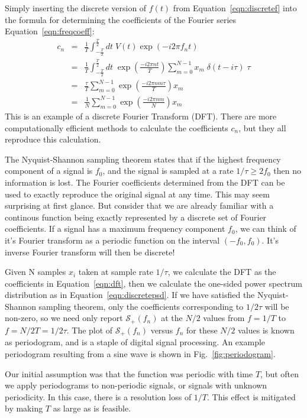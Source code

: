 \documentclass[12pt]{article}
\begin{document}
Simply inserting the discrete version of $f(t)$ from Equation~\ref{eqn:discretef} into the formula for determining the coefficients of the Fourier series Equation~\ref{eqn:freqcoeff}:
\begin{eqnarray}
c_n &=& \frac{1}{T} \int_{-\frac{T}{2}}^{\frac{T}{2}} dt \; V(t) \exp(-i2\pi f_n t) \nonumber \\
&=& \frac{1}{T} \int_{-\frac{T}{2}}^{\frac{T}{2}} dt \; \exp\left(\frac{-i2\pi n t}{T} \right) \sum_{m=0}^{N-1} x_m\; 
\delta(t - i\tau) \; \tau \nonumber \\
&=& \frac{\tau}{T}  \sum_{m=0}^{N-1} \exp\left(\frac{-i2\pi n m \tau }{T} \right)  x_m \nonumber \\
&=& \frac{1}{N}  \sum_{m=0}^{N-1} \exp\left(\frac{-i2\pi n m }{N} \right)  x_m \label{eqn:dft}
\end{eqnarray}
This is an example of a discrete Fourier Transform (DFT).  There are more computationally efficient methods to calculate the coefficients $c_n$, but they all reproduce this calculation.  

The Nyquist-Shannon sampling theorem states that if the highest frequency component of a signal is $f_0$, and the signal is sampled at a rate $1/\tau \geq 2f_0$ then no information is lost.  The Fourier coefficients determined from the DFT can be used to exactly reproduce the original signal at any time.  This may seem surprising at first glance.  But consider that we are already familiar with a continous function being exactly represented by a discrete set of Fourier coefficients.  If a signal has a maximum frequency component $f_0$, we can think of it's Fourier transform as a periodic function on the interval $(-f_0, f_0)$.  It's inverse Fourier transform will then be discrete!

Given N samples $x_i$ taken at sample rate $1/\tau$, we calculate the DFT as the coefficients in Equation~\ref{eqn:dft}, then we calculate the one-sided power spectrum distribution as in Equation~\ref{eqn:discretepsd}.  If we have satisfied the Nyquist-Shannon sampling theorem, only the coefficients corresponding to $1/2\tau$ will be non-zero, so we need only report $\mathcal{S}_{+}(f_n)$ at the $N/2$ values from $f=1/T$ to $f=N/2T=1/2\tau$.  The plot of $\mathcal{S}_{+}(f_n)$ versus $f_n$ for these $N/2$ values is known as periodogram, and is a staple of digital signal processing.  An example periodogram resulting from a sine wave is shown in Fig.~\ref{fig:periodogram}.

Our initial assumption was that the function was periodic with time $T$, but often we apply periodograms to non-periodic signals, or signals with unknown periodicity.  In this case, there is a resolution loss of $1/T$.  This effect is mitigated by making $T$ as large as is feasible. 
\end{document}
